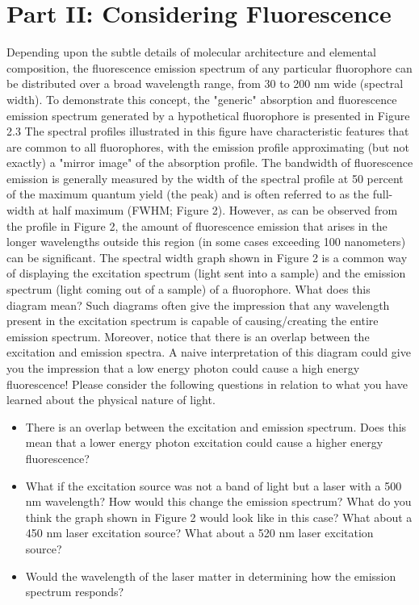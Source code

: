 \section*{Part II: Considering Fluorescence}
Depending upon the subtle details of molecular architecture and elemental composition, the fluorescence emission spectrum of any particular fluorophore can be distributed over a broad wavelength range, from 30 to 200 nm wide (spectral width). 
To demonstrate this concept, the "generic" absorption and fluorescence emission spectrum generated by a hypothetical fluorophore is presented in Figure 2.3 The spectral profiles illustrated in this figure have characteristic features that are common to all fluorophores, with the emission profile approximating (but not exactly) a "mirror image" of the absorption profile. 
The bandwidth of fluorescence emission is generally measured by the width of the spectral profile at 50 percent of the maximum quantum yield (the peak) and is often referred to as the full-width at half maximum (FWHM; Figure 2). 
However, as can be observed from the profile in Figure 2, the amount of fluorescence emission that arises in the longer wavelengths outside this region (in some cases exceeding 100 nanometers) can be significant. 
The spectral width graph shown in Figure 2 is a common way of displaying the excitation spectrum (light sent into a sample) and the emission spectrum (light coming out of a sample) of a fluorophore. 
What does this diagram mean? Such diagrams often give the impression that any wavelength present in the excitation spectrum is capable of causing/creating the entire emission spectrum. 
Moreover, notice that there is an overlap between the excitation and emission spectra. 
A naive interpretation of this diagram could give you the impression that a low energy photon could cause a high energy fluorescence! 
Please consider the following questions in relation to what you have learned about the physical nature of light.

\begin{itemize}
\itemsep-0.3em
\item There is an overlap between the excitation and emission spectrum. Does this mean that a lower energy photon excitation could cause a higher energy fluorescence?
\item What if the excitation source was not a band of light but a laser with a 500 nm wavelength? How would this change the emission spectrum? What do you think the graph shown in Figure 2 would look like in this case? What about a 450 nm laser excitation source? What about a 520 nm laser excitation source?
\item Would the wavelength of the laser matter in determining how the emission spectrum responds?
\end{itemize}
